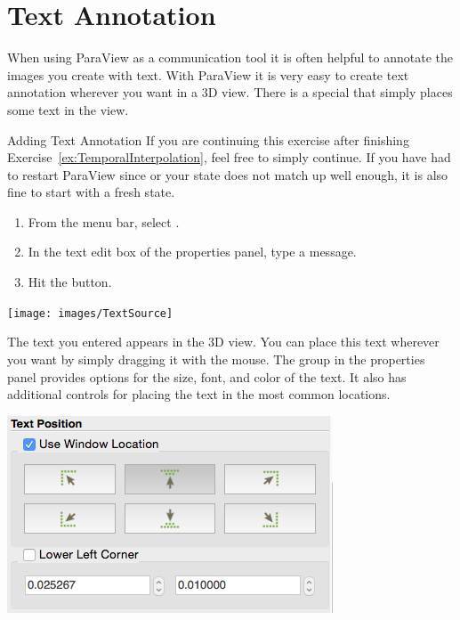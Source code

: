 \section{Text Annotation}


When using ParaView as a communication tool it is often helpful to annotate
the images you create with text.  With ParaView it is very easy to create
text annotation wherever you want in a 3D view.  There is a special
 that simply places some text in the view.

\begin{exercise}{Adding Text Annotation}
  \label{ex:AddingTextAnnotation}%
  If you are continuing this exercise after finishing
  Exercise~\ref{ex:TemporalInterpolation}, feel free to simply continue.
  If you have had to restart ParaView since or your state does not match up
  well enough, it is also fine to start with a fresh state.

  \begin{enumerate}
  \item From the menu bar, select  \ra {}.
  \item In the text edit box of the properties panel, type a message.
  \item Hit the \apply button.
  \end{enumerate}

  \begin{inlinefig}
    \texttt{[image: images/TextSource]}
  \end{inlinefig}

  The text you entered appears in the 3D view.  You can place this text
  wherever you want by simply dragging it with the mouse.  The
   group in the properties panel provides options for
  the size, font, and color of the text.  It also has additional controls
  for placing the text in the most common locations.

  \begin{inlinefig}
    \includegraphics[width=.75\scw]{images/TextPosition}
  \end{inlinefig}
\end{exercise}

